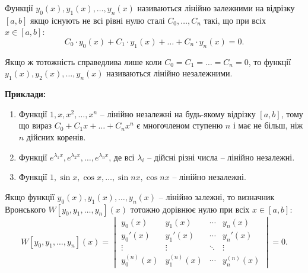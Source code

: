 \begin{definition}
	Функції $y_0(x), y_1(x), \ldots, y_n(x)$ називаються лінійно залежними на відрізку $[a,b]$ якщо існують не всі рівні нулю сталі $C_0, \ldots, C_n$ такі, що при всіх $x \in [a,b]$: 
	\begin{equation*}
		C_0 \cdot y_0(x) + C_1 \cdot y_1(x) + \ldots + C_n \cdot y_n(x) = 0.
	\end{equation*}

	Якщо ж тотожність справедлива лише коли $C_0 = C_1 = \ldots = C_n = 0$, то функції $y_1(x), y_2(x), \ldots, y_n(x)$ називаються лінійно незалежними.
\end{definition}

\textbf{Приклади:}
\begin{enumerate}
	\item Функції $1, x, x^2, \ldots, x^n$ -- лінійно незалежні на будь-якому відрізку $[a,b]$, тому що вираз $C_0 + C_1 x + \ldots + C_n x^n$ є многочленом ступеню $n$ і має не більш, ніж $n$ дійсних коренів.
	\item Функції $e^{\lambda_1 x}, e^{\lambda_2 x}, \ldots, e^{\lambda_n x}$, де всі $\lambda_i$ -- дійсні різні числа -- лінійно незалежні. 
	\item Функції $1, \sin x, \cos x, \ldots, \sin nx, \cos nx$ -- лінійно незалежні.
\end{enumerate}

\begin{theorem}
	Якщо функції $y_0(x), y_1(x), \ldots, y_n(x)$ -- лінійно залежні, то визначник Вронського $W[y_0, y_1, \ldots, y_n](x)$ тотожно дорівнює нулю при всіх $x \in [a,b]$:
	\begin{equation*}
		W[y_0, y_1, \ldots, y_n](x) = \begin{vmatrix} y_0(x) & y_1(x) & \cdots & y_n(x) \\ y_0'(x) & y_1'(x) & \cdots & y_n'(x) \\ \vdots & \vdots & \ddots & \vdots \\ y_0^{(n)}(x) & y_1^{(n)}(x) & \cdots & y_n^{(n)}(x) \end{vmatrix} = 0.
	\end{equation*}
\end{theorem}

